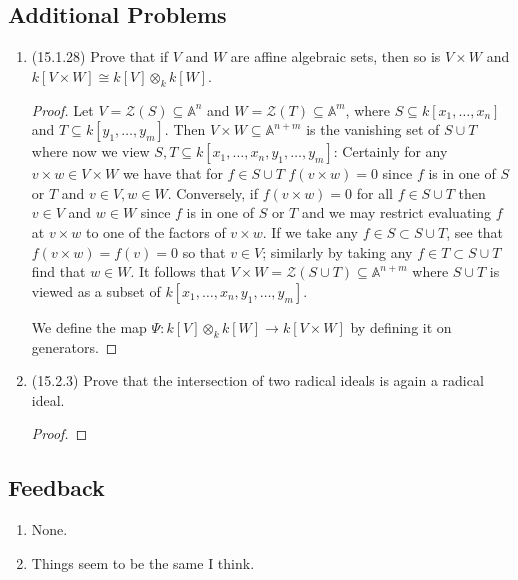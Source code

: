 \documentclass[11pt]{article}
\begin{document}
\subsection*{Additional Problems}
\begin{enumerate}
    \item (15.1.28) Prove that if $V$ and $W$ are affine algebraic sets, then so is $V\times W$ and $k[V\times W]\cong k[V]\otimes_kk[W]$. \begin{proof}
        Let $V = \mathcal{Z}(S)\subseteq \mathbb{A}^n$ and $W = \mathcal{Z}(T)\subseteq \mathbb{A}^m$, where $S\subseteq k[x_1,\dots,x_n]$ and $T\subseteq k[y_1,\dots,y_m]$. Then $V\times W \subseteq \mathbb{A}^{n+m}$ is the vanishing set of $S\cup T$ where now we view $S,T\subseteq k[x_1,\dots,x_n,y_1,\dots,y_m]$: Certainly for any $v\times w\in V\times W$ we have that for $f\in S\cup T$ $f(v\times w) = 0$ since $f$ is in one of $S$ or $T$ and $v\in V, w\in W$. Conversely, if $f(v\times w) = 0$ for all $f\in S\cup T$ then $v\in V$ and $w\in W$ since $f$ is in one of $S$ or $T$ and we may restrict evaluating $f$ at $v\times w$ to one of the factors of $v\times w$. If we take any $f\in S\subset S\cup T$, see that $f(v\times w) = f(v) = 0$ so that $v\in V$; similarly by taking any $f\in T\subset S\cup T$ find that $w\in W$. It follows that $V\times W = \mathcal{Z}(S\cup T)\subseteq \mathbb{A}^{n+m}$ where $S\cup T$ is viewed as a subset of $k[x_1,\dots,x_n,y_1,\dots,y_m]$.

        We define the map $\Psi\colon k[V]\otimes_kk[W]\to k[V\times W]$ by defining it on generators. %
    \end{proof}
    \item (15.2.3) Prove that the intersection of two radical ideals is again a radical ideal. \begin{proof}
        
    \end{proof}
\end{enumerate}
\subsection*{Feedback}
\begin{enumerate}
    \item None.
    \item Things seem to be the same I think.
\end{enumerate}
\end{document}
